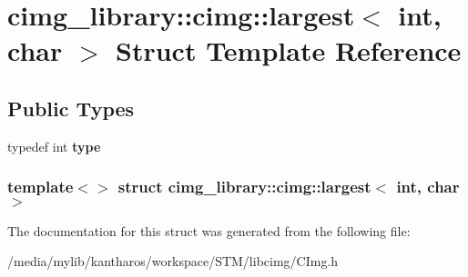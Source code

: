 \hypertarget{structcimg__library_1_1cimg_1_1largest_3_01int_00_01char_01_4}{
\section{cimg\_\-library::cimg::largest$<$ int, char $>$ Struct Template Reference}
\label{structcimg__library_1_1cimg_1_1largest_3_01int_00_01char_01_4}
}
\subsection*{Public Types}
\begin{DoxyCompactItemize}
\item 
\hypertarget{structcimg__library_1_1cimg_1_1largest_3_01int_00_01char_01_4_a69fd23934a95649620513994ed8d5472}{
typedef int {\bfseries type}}
\label{structcimg__library_1_1cimg_1_1largest_3_01int_00_01char_01_4_a69fd23934a95649620513994ed8d5472}

\end{DoxyCompactItemize}
\subsubsection*{template$<$$>$ struct cimg\_\-library::cimg::largest$<$ int, char $>$}



The documentation for this struct was generated from the following file:\begin{DoxyCompactItemize}
\item 
/media/mylib/kantharos/workspace/STM/libcimg/CImg.h\end{DoxyCompactItemize}
